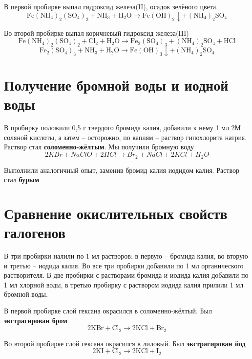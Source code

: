 \documentclass[a4paper,12pt]{article}
\begin{document}
В первой пробирке выпал гидроксид железа(II), осадок зелёного цвета.
\begin{equation} 
\mathrm{Fe(NH_4)_2(SO_4)_2 + NH_3 + H_2O \longrightarrow Fe(OH)_2\downarrow + (NH_4)_2SO_4} 
\end{equation}

Во второй пробирке выпал коричневый гидроксид железа(III)
\begin{equation} 
\mathrm{Fe(NH_4)_2(SO_4)_2 + Cl_2+H_2O \longrightarrow Fe_2(SO_4)_3+(NH_4)_2SO_4+HCl} 
\end{equation}
\begin{equation} 
\mathrm{Fe_2(SO_4)_3 + NH_3 + H_2O \longrightarrow Fe(OH)_3\downarrow +(NH_4)_2SO_4} 
\end{equation}

\section{Получение бромной воды и иодной воды}
В пробирку положили 0,5 г твердого бромида калия, добавили к нему 1 мл 2М соляной
кислоты, а затем – осторожно, по каплям – раствор гипохлорита натрия. Раствор стал \textbf{соломенно-жёлтым}. Мы получили бромную воду
\begin{equation}
    2KBr + NaClO + 2HCl \longrightarrow Br_2 + NaCl + 2KCl+ H_2O
\end{equation}


Выполнили аналогичный опыт, заменив бромид калия иодидом калия. Раствор стал \textbf{бурым} 
\section{Сравнение окислительных свойств галогенов}
В три пробирки налили по 1 мл растворов: в первую – бромида калия, во вторую и третью –
иодида калия. Во все три пробирки добавили по 1 мл органического растворителя. В две пробирки
с растворами бромида и иодида калия добавили по 1 мл хлорной воды, в третью пробирку с
раствором иодида калия прилили 1 мл бромной воды. 

 
В первой пробирке слой гексана окрасился в соломенно-жёлтый. Был \textbf{экстрагирован бром}
\begin{equation} 
\mathrm{2KBr+ Cl_2  \longrightarrow 2KCl + Br_2} 
\end{equation}


 
Во второй пробирке слой гексана окрасился в лиловый. Был \textbf{экстрагирован йод}
\begin{equation} 
\mathrm{2KI+ Cl_2  \longrightarrow 2KCl + I_2} 
\end{equation}
\end{document}
